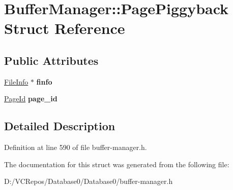 \hypertarget{struct_buffer_manager_1_1_page_piggyback}{}\section{Buffer\+Manager\+::Page\+Piggyback Struct Reference}
\label{struct_buffer_manager_1_1_page_piggyback}
\subsection*{Public Attributes}
\begin{DoxyCompactItemize}
\item 
\mbox{\label{struct_buffer_manager_1_1_page_piggyback_a427ec11c71658ac060d17160f91f8f67}} 
\mbox{\hyperlink{struct_buffer_manager_1_1_file_info}{File\+Info}} $\ast$ {\bfseries finfo}
\item 
\mbox{\label{struct_buffer_manager_1_1_page_piggyback_a83c91fd454a9a8ad4eb8921aa674cc6d}} 
\mbox{\hyperlink{struct_generic_i_o_id}{Page\+Id}} {\bfseries page\+\_\+id}
\end{DoxyCompactItemize}


\subsection{Detailed Description}


Definition at line 590 of file buffer-\/manager.\+h.



The documentation for this struct was generated from the following file\+:\begin{DoxyCompactItemize}
\item 
D\+:/\+V\+C\+Repos/\+Database0/\+Database0/buffer-\/manager.\+h\end{DoxyCompactItemize}
